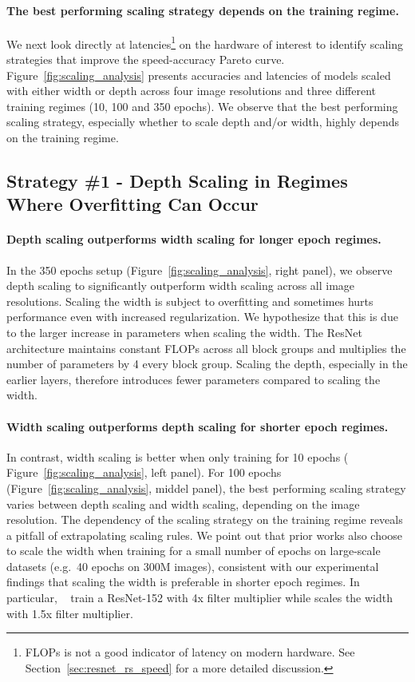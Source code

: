 \documentclass{article}
\begin{document}
\paragraph{The best performing scaling strategy depends on the training regime.}
We next look directly at latencies\footnote{FLOPs is not a good indicator of latency on modern hardware. See Section~\ref{sec:resnet_rs_speed} for a more detailed discussion.} on the hardware of interest to identify scaling strategies that improve the speed-accuracy Pareto curve.
Figure~\ref{fig:scaling_analysis} presents accuracies and latencies of models scaled with either width or depth across four image resolutions and three different training regimes (10, 100 and 350 epochs).
We observe that the best performing scaling strategy, especially whether to scale depth and/or width, highly depends on the training regime.


\subsection{Strategy \#1 - Depth Scaling in Regimes Where Overfitting Can Occur}
\paragraph{Depth scaling outperforms width scaling for longer epoch regimes.} 
In the 350 epochs setup (Figure~\ref{fig:scaling_analysis}, right panel), we observe depth scaling to significantly outperform width scaling across all image resolutions.
Scaling the width is subject to overfitting and sometimes hurts performance even with increased regularization.
We hypothesize that this is due to the larger increase in parameters when scaling the width. 
The ResNet architecture maintains constant FLOPs across all block groups and multiplies the number of parameters by 4 every block group.
Scaling the depth, especially in the earlier layers, therefore introduces fewer parameters compared to scaling the width.

\paragraph{Width scaling outperforms depth scaling for shorter epoch regimes.} 
In contrast, width scaling is better when only training for 10 epochs ( Figure~\ref{fig:scaling_analysis}, left panel).
For 100 epochs (Figure~\ref{fig:scaling_analysis}, middel panel), the best performing scaling strategy varies between depth scaling and width scaling, depending on the image resolution.
The dependency of the scaling strategy on the training regime reveals a pitfall of extrapolating scaling rules.
We point out that prior works also choose to scale the width when training for a small number of epochs on large-scale datasets (e.g.\ 40 epochs on 300M images), consistent with our experimental findings that scaling the width is preferable in shorter epoch regimes.
In particular, ~\citet{kolesnikov2019big} train a ResNet-152 with 4x filter multiplier while \citet{brock2021highperformance} scales the width with 1.5x filter multiplier.
\end{document}
